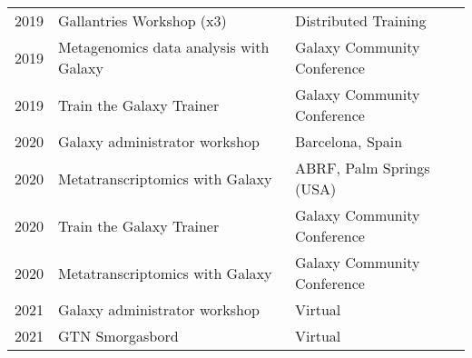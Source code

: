 \begin{table}[h!]
\begin{tabular}{lll}
        2019 & Gallantries Workshop (x3)                       & Distributed Training \\
        2019 & Metagenomics data analysis with Galaxy          & Galaxy Community Conference \\
        2019 & Train the Galaxy Trainer                        & Galaxy Community Conference \\
        2020 & Galaxy administrator workshop                   & Barcelona, Spain \\
        2020 & Metatranscriptomics with Galaxy                 & ABRF, Palm Springs (USA) \\
        2020 & Train the Galaxy Trainer                        & Galaxy Community Conference \\
        2020 & Metatranscriptomics with Galaxy                 & Galaxy Community Conference \\
        2021 & Galaxy administrator workshop                   & Virtual \\
        2021 & GTN Smorgasbord                                 & Virtual \\
    \end{tabular}
\end{table}


\normalsize

